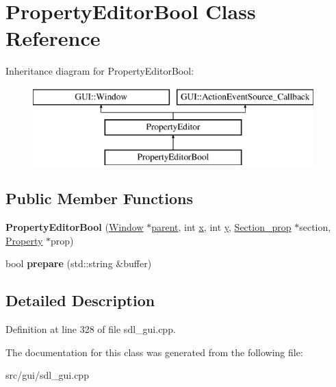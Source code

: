 \hypertarget{classPropertyEditorBool}{\section{Property\-Editor\-Bool Class Reference}
\label{classPropertyEditorBool}
}
Inheritance diagram for Property\-Editor\-Bool\-:\begin{figure}[H]
\begin{center}
\leavevmode
\includegraphics[height=3.000000cm]{classPropertyEditorBool}
\end{center}
\end{figure}
\subsection*{Public Member Functions}
\begin{DoxyCompactItemize}
\item 
\hypertarget{classPropertyEditorBool_a428b59bceb9e5d0c7fae949eb43511da}{{\bfseries Property\-Editor\-Bool} (\hyperlink{classGUI_1_1Window_ae828e9daa964dfc65a3550fb03117d30}{Window} $\ast$\hyperlink{classGUI_1_1Window_a2e593ff65e7702178d82fe9010a0b539}{parent}, int \hyperlink{classGUI_1_1Window_a6ca6a80ca00c9e1d8ceea8d3d99a657d}{x}, int \hyperlink{classGUI_1_1Window_a0ee8e923aff2c3661fc2e17656d37adf}{y}, \hyperlink{classSection__prop}{Section\-\_\-prop} $\ast$section, \hyperlink{classProperty}{Property} $\ast$prop)}\label{classPropertyEditorBool_a428b59bceb9e5d0c7fae949eb43511da}

\item 
\hypertarget{classPropertyEditorBool_a44c917ecde4468be2873d8580d5072ce}{bool {\bfseries prepare} (std\-::string \&buffer)}\label{classPropertyEditorBool_a44c917ecde4468be2873d8580d5072ce}

\end{DoxyCompactItemize}


\subsection{Detailed Description}


Definition at line 328 of file sdl\-\_\-gui.\-cpp.



The documentation for this class was generated from the following file\-:\begin{DoxyCompactItemize}
\item 
src/gui/sdl\-\_\-gui.\-cpp\end{DoxyCompactItemize}
